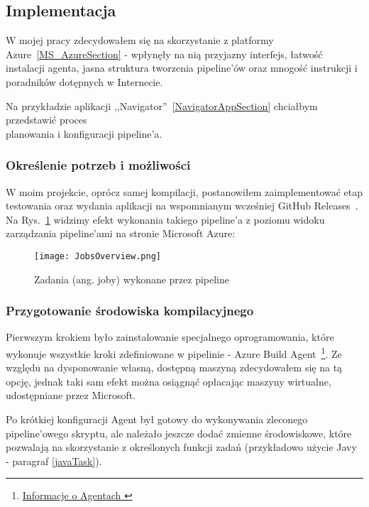 \subsection{Implementacja}
W mojej pracy zdecydowałem się na skorzystanie z platformy Azure~\ref{MS_AzureSection} - 
wpłynęły na nią przyjazny interfejs, łatwość instalacji agenta, jasna struktura tworzenia pipeline'ów 
oraz mnogość instrukcji i poradników dotępnych w Internecie.

Na przykładzie aplikacji ,,Navigator''~\ref{NavigatorAppSection} chciałbym przedstawić proces \\
planowania i konfiguracji pipeline'a.

\subsubsection{Określenie potrzeb i możliwości}
W moim projekcie, oprócz samej kompilacji, postanowiłem zaimplementować etap testowania 
oraz wydania aplikacji na wspomnianym wcześniej GitHub Releases~\cite{githubReleases}.
Na Rys.~\ref{img:JobsOverview} widzimy efekt wykonania takiego pipeline'a z poziomu 
widoku zarządzania pipeline'ami na stronie Microsoft Azure:

\begin{figure}[ht]
    \centering
    \texttt{[image: JobsOverview.png]}
    \caption{Zadania (ang. joby) wykonane przez pipeline}
    \label{img:JobsOverview}
\end{figure}

\subsubsection{Przygotowanie środowiska kompilacyjnego}
Pierwszym krokiem było zainstalowanie specjalnego oprogramowania, 
które wykonuje wszystkie kroki zdefiniowane w pipelinie - Azure Build Agent~\footnote{
    \href{https://learn.microsoft.com/en-us/azure/devops/pipelines/agents/agents}{
        Informacje o Agentach
    }
}.
Ze względu na dysponowanie własną, dostępną maszyną zdecydowałem się na tą opcję,
jednak taki sam efekt można osiągnąć opłacając maszyny wirtualne, udostępniane przez Microsoft.

Po krótkiej konfiguracji Agent był gotowy do wykonywania zleconego pipeline'owego skryptu, 
ale należało jeszcze dodać zmienne środowiskowe, które pozwalają na 
skorzystanie z określonych funkcji zadań (przykładowo użycie Javy - paragraf \ref{javaTask}).

